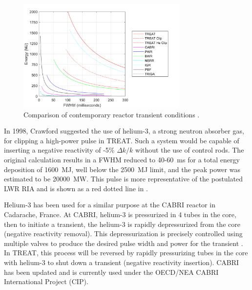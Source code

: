 \begin{figure}[htbp]
    \vspace{16pt}
    \centering
    \includegraphics[width=0.75\textwidth]{intro/plots/ReactorTransientComp_Kevin.png}
    \caption{Comparison of contemporary reactor transient conditions \cite{BESS2019}.}
    \label{fig:trans comp}
    \vspace{16pt}
\end{figure}


In 1998, Crawford \cite{Crawford1998} suggested the use of helium-3, a strong neutron absorber gas, for clipping a high-power pulse in TREAT. Such a system would be capable of inserting a negative reactivity of -5\% $\Delta k/k$ without the use of control rods. The original calculation results in a FWHM reduced to 40-\SI{60}{\milli\second} for a total energy deposition of \SI{1600}{\mega\joule}, well below the \SI{2500}{\mega\joule} limit, and the peak power was estimated to be \SI{20000}{\mega\watt}. This pulse is more representative of the postulated LWR RIA and is shown as a red dotted line in .

Helium-3 has been used for a similar purpose at the CABRI reactor in Cadarache, France. At CABRI, helium-3 is pressurized in 4 tubes in the core, then to initiate a transient, the helium-3 is rapidly depressurized from the core (negative reactivity removal). This depressurization is precisely controlled using multiple valves to produce the desired pulse width and power for the transient \cite{Clamens2016,Clamens2018,Clamens2018b}. In TREAT, this process will be reversed by rapidly pressurizing tubes in the core with helium-3 to shut down a transient (negative reactivity insertion). CABRI has been updated and is currently used under the OECD/NEA CABRI International Project (CIP).

